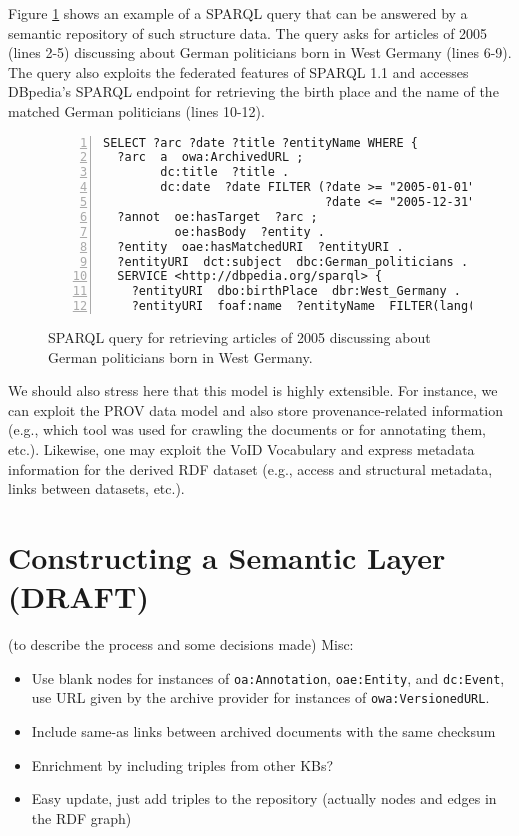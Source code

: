 \documentclass[runningheads,a4paper]{libtex/llncs}
\begin{document}
Figure \ref{fig:queryExample1} shows an example of a SPARQL query
that can be answered by a semantic repository of such structure data.
The query asks for articles of 2005 (lines 2-5)
discussing about German politicians born in West Germany (lines 6-9).
The query also exploits the federated features of SPARQL 1.1 \cite{prud2013sparql}
and accesses DBpedia's SPARQL endpoint for retrieving the
birth place and the name of the matched German politicians (lines 10-12).


\begin{figure}[th]
\centering \scriptsize
\begin{Verbatim}[frame=lines,numbers=left,numbersep=1pt]
SELECT ?arc ?date ?title ?entityName WHERE {
  ?arc  a  owa:ArchivedURL ;
        dc:title  ?title .
        dc:date  ?date FILTER (?date >= "2005-01-01"^^xsd:dateTime &&
                               ?date <= "2005-12-31"^^xsd:dateTime) .
  ?annot  oe:hasTarget  ?arc ;
          oe:hasBody  ?entity .
  ?entity  oae:hasMatchedURI  ?entityURI .
  ?entityURI  dct:subject  dbc:German_politicians .
  SERVICE <http://dbpedia.org/sparql> {
    ?entityURI  dbo:birthPlace  dbr:West_Germany .
    ?entityURI  foaf:name  ?entityName  FILTER(lang(?entityName)="en") } }
\end{Verbatim}
\vspace{-4.5mm}
\caption{SPARQL query for retrieving articles of 2005 discussing
about German politicians born in West Germany.}
\label{fig:queryExample1}
\end{figure}


We should also stress here that this model is highly extensible.
For instance, we can exploit the PROV data model \cite{moreau2013prov}
and also store provenance-related information
(e.g., which tool was used for crawling the documents or for annotating them, etc.).
Likewise, one may exploit the VoID Vocabulary \cite{alexander2011describing}
and express metadata information for the derived RDF dataset
(e.g., access and structural metadata, links between datasets, etc.).




\section{Constructing a Semantic Layer (DRAFT)}
\label{sec:constrSemLayer}
(to describe the process and some decisions made)
Misc:
\begin{itemize}
\item   Use blank nodes for instances of {\tt oa:Annotation}, {\tt oae:Entity}, and {\tt dc:Event},
        use URL given by the archive provider for instances of {\tt owa:VersionedURL}.
\item   Include same-as links between archived documents with the same checksum
\item   Enrichment by including triples from other KBs?
\item   Easy update, just add triples to the repository (actually nodes and edges in the RDF graph)
\end{itemize}
\end{document}
